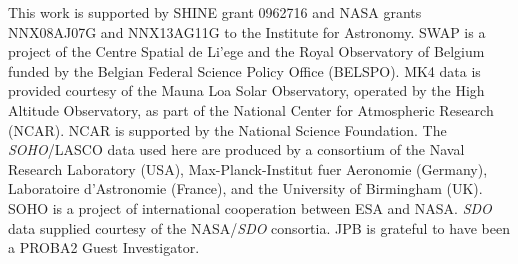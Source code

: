 \documentclass[namedreferences]{solarphysics}
\begin{document}
\begin{article}
%



%
  

%



%
 \begin{acks}
 
This work is supported by SHINE grant 0962716 and NASA grants NNX08AJ07G and NNX13AG11G to the Institute for Astronomy.
SWAP is a project of the Centre Spatial de Li'ege and the Royal Observatory of Belgium funded by the Belgian Federal Science Policy Office (BELSPO).
MK4 data is provided courtesy of the Mauna Loa Solar Observatory, operated by the High Altitude Observatory, as part of the National Center for Atmospheric Research (NCAR). NCAR is supported by the National Science Foundation.
The \emph{SOHO}/LASCO data used here are produced by a consortium of the Naval Research Laboratory (USA), Max-Planck-Institut fuer Aeronomie (Germany), Laboratoire d'Astronomie (France), and the University of Birmingham (UK). SOHO is a project of international cooperation between ESA and NASA.
\emph{SDO} data supplied courtesy of the NASA/\emph{SDO} consortia. JPB is grateful to have been a PROBA2 Guest Investigator.

 \end{acks}


%
%
 
   
%
%
%   
%  

\end{article} 
\end{document}
